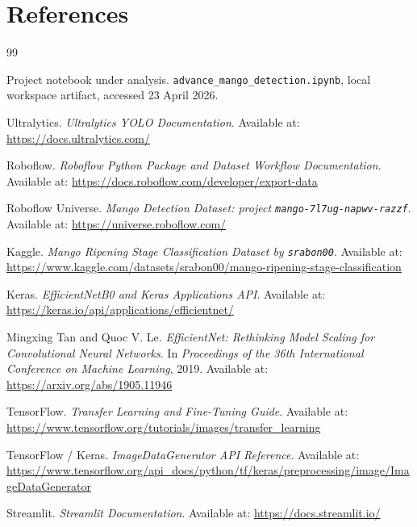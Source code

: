 \documentclass[12pt,a4paper]{article}
\begin{document}
\section{References}
\begin{thebibliography}{99}

Project notebook under analysis.
\newblock \texttt{advance\_mango\_detection.ipynb}, local workspace artifact, accessed 23 April 2026.

Ultralytics.
\newblock \emph{Ultralytics YOLO Documentation}.
\newblock Available at: \url{https://docs.ultralytics.com/}

Roboflow.
\newblock \emph{Roboflow Python Package and Dataset Workflow Documentation}.
\newblock Available at: \url{https://docs.roboflow.com/developer/export-data}

Roboflow Universe.
\newblock \emph{Mango Detection Dataset: project \texttt{mango-7l7ug-napwv-razzf}}.
\newblock Available at: \url{https://universe.roboflow.com/}

Kaggle.
\newblock \emph{Mango Ripening Stage Classification Dataset by \texttt{srabon00}}.
\newblock Available at: \url{https://www.kaggle.com/datasets/srabon00/mango-ripening-stage-classification}

Keras.
\newblock \emph{EfficientNetB0 and Keras Applications API}.
\newblock Available at: \url{https://keras.io/api/applications/efficientnet/}

Mingxing Tan and Quoc V. Le.
\newblock \emph{EfficientNet: Rethinking Model Scaling for Convolutional Neural Networks}.
\newblock In \emph{Proceedings of the 36th International Conference on Machine Learning}, 2019.
\newblock Available at: \url{https://arxiv.org/abs/1905.11946}

TensorFlow.
\newblock \emph{Transfer Learning and Fine-Tuning Guide}.
\newblock Available at: \url{https://www.tensorflow.org/tutorials/images/transfer_learning}

TensorFlow / Keras.
\newblock \emph{ImageDataGenerator API Reference}.
\newblock Available at: \url{https://www.tensorflow.org/api_docs/python/tf/keras/preprocessing/image/ImageDataGenerator}

Streamlit.
\newblock \emph{Streamlit Documentation}.
\newblock Available at: \url{https://docs.streamlit.io/}

\end{thebibliography}
\end{document}
